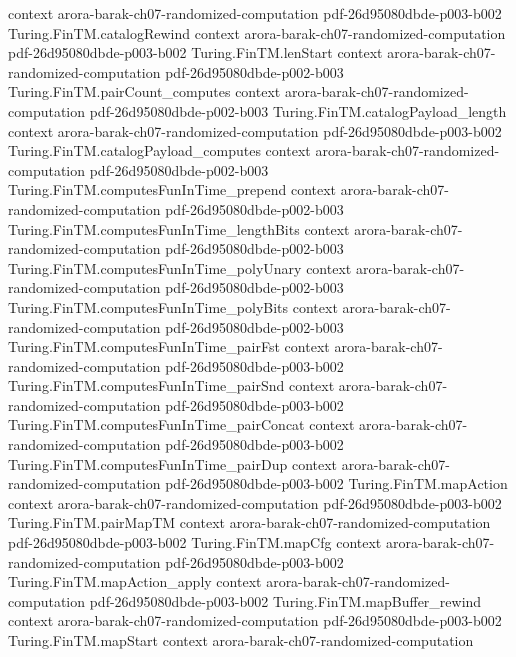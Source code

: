 \begin{theorem}
  {context}
  {arora-barak-ch07-randomized-computation}
  {pdf-26d95080dbde-p003-b002}
\proofstep
  {Turing.FinTM.catalogRewind}
  {context}
  {arora-barak-ch07-randomized-computation}
  {pdf-26d95080dbde-p003-b002}
\proofstep
  {Turing.FinTM.lenStart}
  {context}
  {arora-barak-ch07-randomized-computation}
  {pdf-26d95080dbde-p002-b003}
\proofstep
  {Turing.FinTM.pairCount_computes}
  {context}
  {arora-barak-ch07-randomized-computation}
  {pdf-26d95080dbde-p002-b003}
\proofstep
  {Turing.FinTM.catalogPayload_length}
  {context}
  {arora-barak-ch07-randomized-computation}
  {pdf-26d95080dbde-p003-b002}
\proofstep
  {Turing.FinTM.catalogPayload_computes}
  {context}
  {arora-barak-ch07-randomized-computation}
  {pdf-26d95080dbde-p002-b003}
\proofstep
  {Turing.FinTM.computesFunInTime_prepend}
  {context}
  {arora-barak-ch07-randomized-computation}
  {pdf-26d95080dbde-p002-b003}
\proofstep
  {Turing.FinTM.computesFunInTime_lengthBits}
  {context}
  {arora-barak-ch07-randomized-computation}
  {pdf-26d95080dbde-p002-b003}
\proofstep
  {Turing.FinTM.computesFunInTime_polyUnary}
  {context}
  {arora-barak-ch07-randomized-computation}
  {pdf-26d95080dbde-p002-b003}
\proofstep
  {Turing.FinTM.computesFunInTime_polyBits}
  {context}
  {arora-barak-ch07-randomized-computation}
  {pdf-26d95080dbde-p002-b003}
\proofstep
  {Turing.FinTM.computesFunInTime_pairFst}
  {context}
  {arora-barak-ch07-randomized-computation}
  {pdf-26d95080dbde-p003-b002}
\proofstep
  {Turing.FinTM.computesFunInTime_pairSnd}
  {context}
  {arora-barak-ch07-randomized-computation}
  {pdf-26d95080dbde-p003-b002}
\proofstep
  {Turing.FinTM.computesFunInTime_pairConcat}
  {context}
  {arora-barak-ch07-randomized-computation}
  {pdf-26d95080dbde-p003-b002}
\proofstep
  {Turing.FinTM.computesFunInTime_pairDup}
  {context}
  {arora-barak-ch07-randomized-computation}
  {pdf-26d95080dbde-p003-b002}
\proofstep
  {Turing.FinTM.mapAction}
  {context}
  {arora-barak-ch07-randomized-computation}
  {pdf-26d95080dbde-p003-b002}
\proofstep
  {Turing.FinTM.pairMapTM}
  {context}
  {arora-barak-ch07-randomized-computation}
  {pdf-26d95080dbde-p003-b002}
\proofstep
  {Turing.FinTM.mapCfg}
  {context}
  {arora-barak-ch07-randomized-computation}
  {pdf-26d95080dbde-p003-b002}
\proofstep
  {Turing.FinTM.mapAction_apply}
  {context}
  {arora-barak-ch07-randomized-computation}
  {pdf-26d95080dbde-p003-b002}
\proofstep
  {Turing.FinTM.mapBuffer_rewind}
  {context}
  {arora-barak-ch07-randomized-computation}
  {pdf-26d95080dbde-p003-b002}
\proofstep
  {Turing.FinTM.mapStart}
  {context}
  {arora-barak-ch07-randomized-computation}

\end{theorem}
